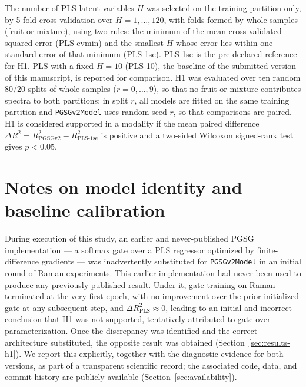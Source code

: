 \documentclass[preprint,12pt]{elsarticle}
\begin{document}
The number of PLS latent variables $H$ was selected on the training partition only, by 5-fold cross-validation over $H=1,\dots,120$, with folds formed by whole samples (fruit or mixture), using two rules: the minimum of the mean cross-validated squared error (PLS-cvmin) and the smallest $H$ whose error lies within one standard error of that minimum (PLS-1se). PLS-1se is the pre-declared reference for H1. PLS with a fixed $H=10$ (PLS-10), the baseline of the submitted version of this manuscript, is reported for comparison. H1 was evaluated over ten random 80/20 splits of whole samples ($r=0,\dots,9$), so that no fruit or mixture contributes spectra to both partitions; in split $r$, all models are fitted on the same training partition and \texttt{PGSGv2Model} uses random seed $r$, so that comparisons are paired. H1 is considered supported in a modality if the mean paired difference $\Delta R^{2}=R^{2}_{\mathrm{PGSGv2}}-R^{2}_{\mathrm{PLS\text{-}1se}}$ is positive and a two-sided Wilcoxon signed-rank test gives $p<0.05$.

\section{Notes on model identity and baseline calibration}
\label{sec:model-identity}

During execution of this study, an earlier and never-published PGSG implementation --- a softmax gate over a PLS regressor optimized by finite-difference gradients --- was inadvertently substituted for \texttt{PGSGv2Model} in an initial round of Raman experiments. This earlier implementation had never been used to produce any previously published result. Under it, gate training on Raman terminated at the very first epoch, with no improvement over the prior-initialized gate at any subsequent step, and $\Delta R^{2}_{\mathrm{PLS}}\approx0$, leading to an initial and incorrect conclusion that H1 was not supported, tentatively attributed to gate over-parameterization. Once the discrepancy was identified and the correct architecture substituted, the opposite result was obtained (Section~\ref{sec:results-h1}). We report this explicitly, together with the diagnostic evidence for both versions, as part of a transparent scientific record; the associated code, data, and commit history are publicly available (Section~\ref{sec:availability}).
\end{document}
